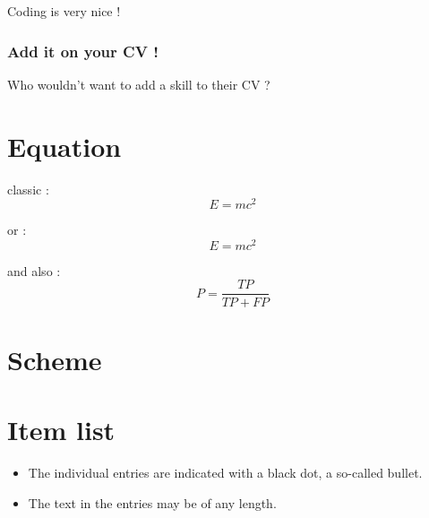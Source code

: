\documentclass[11pt,a4paper]{article}
\begin{document}
Coding is very nice !

\subsubsection{Add it on your CV !}

Who wouldn't want to add a skill to their CV ? 

\section{Equation}


classic : %
\begin{equation}
E = mc^2
\end{equation}

or : %
\[
E = mc^2
\]

and also : %
\begin{equation}
P = \frac{TP}{TP + FP}
\end{equation}

\section{Scheme}




\section{Item list}

\begin{itemize}
  \item The individual entries are indicated with a black dot, a so-called bullet.
  \item The text in the entries may be of any length.
\end{itemize}
\end{document}
